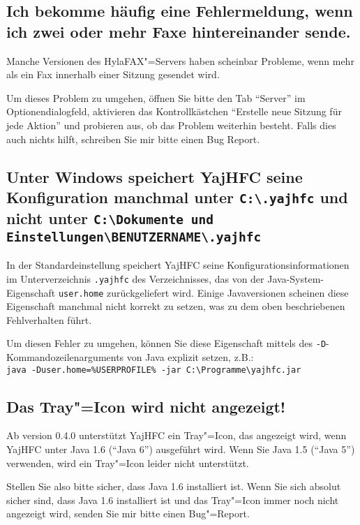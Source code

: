 \documentclass[a4paper,10pt,halfparskip,noparindent]{scrartcl}
\begin{document}
\subsection{Ich bekomme häufig eine Fehlermeldung, wenn ich zwei oder mehr Faxe hintereinander sende.}

Manche Versionen des HylaFAX"=Servers haben scheinbar Probleme, wenn mehr als ein Fax innerhalb einer Sitzung gesendet wird.

Um dieses Problem zu umgehen, öffnen Sie bitte den Tab "`Server"' im Optionendialogfeld, aktivieren das Kontrollkästchen "`Erstelle neue Sitzung für jede Aktion"' und probieren aus, ob das Problem weiterhin besteht.
Falls dies auch nichts hilft, schreiben Sie mir bitte einen Bug Report.


\subsection{Unter Windows speichert YajHFC seine Konfiguration manchmal unter \texttt{C:\textbackslash .yajhfc} und nicht unter \texttt{C:\textbackslash Dokumente und Einstellungen\textbackslash BENUTZERNAME\textbackslash .yajhfc}}

In der Standardeinstellung speichert YajHFC seine Konfigurationsinformationen im Unterverzeichnis \texttt{.yajhfc} des Verzeichnisses, das von der Java-System-Eigenschaft \texttt{user.home} zurückgeliefert wird.
Einige Javaversionen scheinen diese Eigenschaft manchmal nicht korrekt zu setzen, was zu dem oben beschriebenen Fehlverhalten führt.

Um diesen Fehler zu umgehen, können Sie diese Eigenschaft mittels des \texttt{-D}-Kommandozeilenarguments von Java explizit setzen, z.B.: \\
\texttt{java -Duser.home=\%USERPROFILE\% -jar \dq C:\textbackslash Programme\textbackslash yajhfc.jar\dq}

\subsection{Das Tray"=Icon wird nicht angezeigt!}

Ab version 0.4.0 unterstützt YajHFC ein Tray"=Icon, das angezeigt wird, wenn YajHFC unter Java 1.6 ("`Java 6"') ausgeführt wird. Wenn Sie Java 1.5 ("`Java 5"') verwenden, wird ein Tray"=Icon leider nicht unterstützt.

Stellen Sie also bitte sicher, dass Java 1.6 installiert ist. Wenn Sie sich absolut sicher sind, dass Java 1.6 installiert ist und das Tray"=Icon immer noch nicht angezeigt wird, senden Sie mir bitte einen Bug"=Report.
\end{document}
